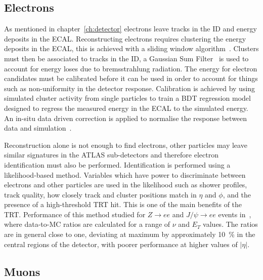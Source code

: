 \subsection{Electrons}
\label{subsec:electrons}

As mentioned in chapter~\ref{ch:detector} electrons leave tracks in the ID and
energy deposits in the ECAL. Reconstructing electrons requires clustering the
energy deposits in the ECAL, this is achieved with a sliding window
algorithm~\cite{Delmastro:1747242}. Clusters must then be associated to tracks
in the ID, a Gaussian Sum Filter~\cite{ATLAS-CONF-2012-047} is used to account
for energy loses due to bremsstrahlung radiation. The energy for electron
candidates must be calibrated before it can be used in order to account for
things such as non-uniformity in the detector response. Calibration is achieved
by using simulated cluster activity from single particles to train a BDT
regression model designed to regress the measured energy in the ECAL to the
simulated energy. An in-situ data driven correction is applied to normalise the
response between data and simulation~\cite{ATL-PHYS-PUB-2016-015}.

Reconstruction alone is not enough to find electrons, other particles may leave
similar signatures in the ATLAS sub-detectors and therefore electron
identification must also be performed. Identification is performed using a
likelihood-based method. Variables which have power to discriminate between
electrons and other particles are used in the likelihood such as shower
profiles, track quality, how closely track and cluster positions match in $\eta$
and $\phi$, and the presence of a high-threshold TRT hit. This is one of the
main benefits of the TRT. Performance of this method studied for $Z \to ee$ and
$J/\psi \to ee$ events in~\cite{ATLAS-CONF-2016-024}, where data-to-MC ratios
are calculated for a range of $\nu$ and $E_T$ values. The ratios are in general
close to one, deviating at maximum by approximately 10~\% in the central regions
of the detector, with poorer performance at higher values of $\lvert \eta
\rvert$.

\subsection{Muons}

